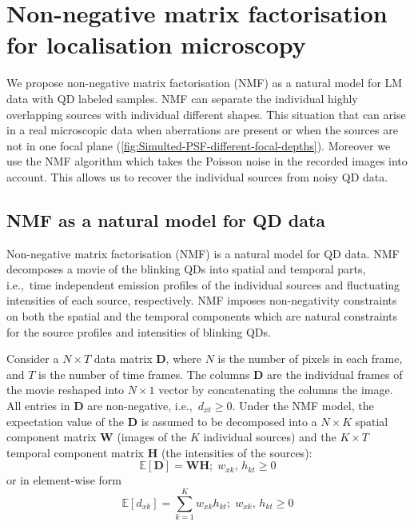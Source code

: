 \chapter{Non-negative matrix factorisation for localisation microscopy}
We propose non-negative matrix factorisation (NMF) \cite{Lee1999} as a natural model for LM data with QD labeled samples. NMF can separate the individual highly overlapping sources with individual different shapes. This situation that can arise in a real microscopic data when aberrations are present or when the sources are not in one focal plane (\autoref{fig:Simulted-PSF-different-focal-depths}). Moreover we use the NMF algorithm which takes the Poisson noise in the recorded images into account. This allows us to recover the individual sources from noisy QD data.


\section{NMF as a natural model for QD data\label{sec: NMF}}
Non-negative matrix factorisation (NMF) \cite{Lee1999,Lee2001} is a natural model for QD data. NMF decomposes a movie of the blinking QDs into spatial and temporal parts, i.e.,\ time independent emission profiles of the individual sources and fluctuating intensities of each source, respectively. NMF imposes non-negativity constraints on both the spatial and the temporal components which are natural constraints for the source profiles and intensities of blinking QDs.

Consider a $N\times T$ data matrix $\bm{D}$, where $N$ is the number of pixels in each frame, and $T$ is the number of time frames. The columns $\bm{D}$ are the individual frames of the movie reshaped into $N\times 1$ vector by concatenating the columns the image. All entries in $\bm{D}$ are non-negative, i.e.,\ $d_{xt}\geq 0$. Under the NMF model, the expectation value of the $\bm{D}$ is assumed to be decomposed into a $N\times K$ spatial component matrix $\bm{W}$ (images of the $K$ individual sources) and the $K\times T$ temporal component matrix $\bm{H}$ (the intensities of the sources):
%
\begin{equation}
	\mathbb{E}\left[\bm{D}\right]=\bm{WH};\;w_{xk},\, h_{kt}\geq0
	\label{eq:NMF model}
\end{equation}
%
or in element-wise form
%
\begin{equation}
	\mathbb{E}\left[d_{xk}\right]=\sum_{k=1}^{K}w_{xk}h_{kt};\;w_{xk},\, h_{kt}\geq0
	\label{eq:NMF model element-wise}
\end{equation}

